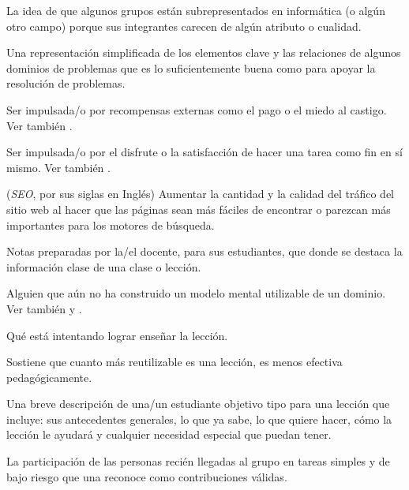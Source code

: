 \begin{description}
 La idea de que algunos grupos
están subrepresentados en informática (o algún otro campo) porque sus integrantes
carecen de algún atributo o cualidad.

 Una representación simplificada
de los elementos clave y las relaciones de algunos dominios de problemas que es
lo suficientemente buena como para apoyar la resolución de problemas.

 Ser impulsada/o por
recompensas externas como el pago o el miedo al castigo. Ver
también .

 Ser impulsada/o por el disfrute o
la satisfacción de hacer una tarea como fin en sí mismo.  Ver también
.

 (\emph{SEO}, por sus siglas en Inglés)  Aumentar la cantidad y la calidad del tráfico del sitio web al hacer que las páginas sean más fáciles de encontrar o parezcan más importantes para los motores de búsqueda.

 Notas preparadas por la/el docente, para sus estudiantes, que donde se destaca la 
información clase de una clase o lección. 

 Alguien que aún no ha construido un modelo mental utilizable de un dominio. 
Ver también  y .

 Qué está intentando lograr enseñar la lección.

 Sostiene que cuanto más reutilizable es una lección, 
es menos efectiva pedagógicamente.

 Una breve descripción de una/un estudiante objetivo tipo para una 
lección que incluye: sus antecedentes generales, lo que ya sabe, lo que quiere hacer, cómo la lección le ayudará 
y cualquier necesidad especial que puedan tener.

 La participación de las personas recién 
llegadas al grupo en tareas simples y de bajo riesgo que una  
 reconoce como contribuciones válidas.


\end{description}
